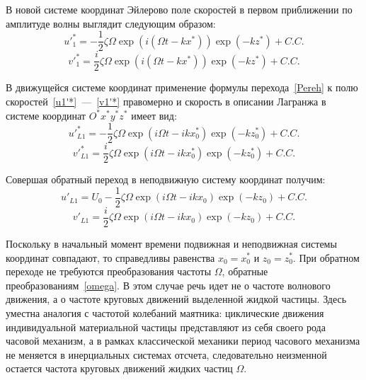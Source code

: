 В новой системе координат Эйлерово поле скоростей в первом приближении по амплитуде волны выглядит следующим образом:
\begin{equation}
u'^{*}_{1}=-\dfrac{1}{2}\zeta  \Omega  \exp \left( i \left( \Omega t -k x^{*}\right) \right) \exp \left( -k z^{*} \right) +C.C.
\label{u1'*}
\end{equation}
\begin{equation}
v'^{*}_{1}=\dfrac{i}{2}\zeta  \Omega \exp \left( i \left( \Omega t -k x^{*}\right) \right) \exp \left( -k z^{*} \right) +C.C.
\label{v1'*}
\end{equation}

В движущейся системе координат применение формулы перехода~\eqref{Pereh} к полю скоростей~\eqref{u1'*}~---~\eqref{v1'*} правомерно и скорость в описании Лагранжа в системе координат $ O^{*}x^{*}y^{*}z^{*} $ имеет вид:
\begin{equation*}
u'^{*}_{L1}=-\dfrac{1}{2}\zeta \Omega \exp \left( i\Omega t-i k x^{*}_{0} \right) \exp \left(-k z^{*}_{0} \right) +C.C.
\end{equation*}
\begin{equation*}
v'^{*}_{L1}=\dfrac{i}{2}\zeta \Omega \exp \left( i\Omega t-i k x^{*}_{0} \right) \exp \left(- k z^{*}_{0} \right) +C.C.
\end{equation*}

Совершая обратный переход в неподвижную систему координат  получим:
\begin{equation}
u'_{L1}=U_{0}-\dfrac{1}{2}\zeta \Omega \exp \left( i\Omega t-i k x_{0} \right) \exp \left(-k z_{0} \right) +C.C.
\label{ul1'}
\end{equation}
\begin{equation}
v'_{L1}=\dfrac{i}{2}\zeta \Omega \exp \left( i\Omega t-i k x_{0} \right) \exp \left(- k z_{0} \right) +C.C.
\label{vl1'}
\end{equation}	 	
	 	
Поскольку в начальный момент времени подвижная и неподвижная системы координат совпадают, то справедливы равенства $ x_{0}=x^{*}_{0} $ и $ z_{0}=z^{*}_{0} $. При обратном переходе не требуются преобразования частоты $ \Omega $, обратные преобразованиям~\eqref{omega}. В этом случае речь идет не о частоте волнового движения, а о частоте круговых движений выделенной жидкой частицы. Здесь уместна аналогия с частотой колебаний маятника: циклические движения индивидуальной материальной частицы представляют из себя своего рода часовой механизм, а в рамках классической механики период часового механизма не меняется в инерциальных системах отсчета, следовательно неизменной остается частота круговых движений жидких частиц $ \Omega $.

